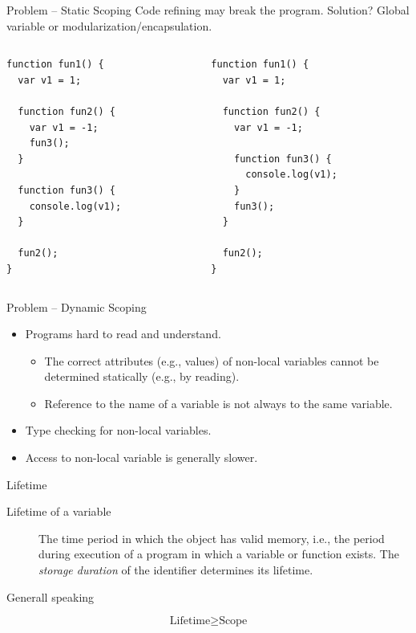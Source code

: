 \documentclass[presentation]{beamer}
\begin{document}
\begin{frame}[fragile,label={sec:orgheadline34}]{Problem -- Static Scoping}
 Code refining may break the program.  Solution?  Global variable or
modularization/encapsulation.

\begin{columns}
\begin{column}{0.5\columnwidth}
\begin{verbatim}
function fun1() {
  var v1 = 1;

  function fun2() {
    var v1 = -1;
    fun3();
  }

  function fun3() {
    console.log(v1);
  }

  fun2();
}
\end{verbatim}
\end{column}

\begin{column}{0.5\columnwidth}
\begin{verbatim}
function fun1() {
  var v1 = 1;

  function fun2() {
    var v1 = -1;

    function fun3() {
      console.log(v1);
    }
    fun3();
  }

  fun2();
}
\end{verbatim}
\end{column}
\end{columns}
\end{frame}

\begin{frame}[label={sec:orgheadline35}]{Problem -- Dynamic Scoping}
\begin{itemize}
\item Programs hard to read and understand.
\begin{itemize}
\item The correct attributes (e.g., values) of non-local variables
cannot be determined statically (e.g., by reading).
\item Reference to the name of a variable is not always to the same
variable.
\end{itemize}
\item Type checking for non-local variables.
\item Access to non-local variable is generally slower.
\end{itemize}
\end{frame}

\begin{frame}[label={sec:orgheadline36}]{Lifetime}
\begin{description}
\item[{Lifetime of a variable}] The time period in which the object has
valid memory, i.e., the period during execution of a program
in which a variable or function exists.  The \emph{storage
duration} of the identifier determines its lifetime.
\end{description}


Generall speaking

\[\text{Lifetime}\geq \text{Scope}
   \]
\end{frame}
\end{document}
